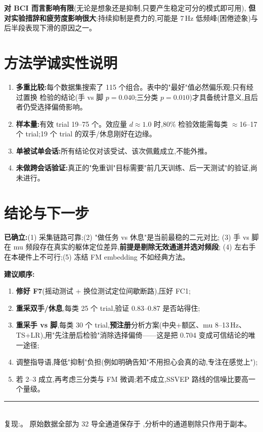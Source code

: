 \documentclass[11pt]{ctexart}
\begin{document}
\noindent\textbf{对 BCI 而言影响有限}(无论是想象还是抑制,只要产生稳定可分的模式即可用),
\textbf{但对实验措辞和疲劳度影响很大}:持续抑制是费力的,可能是 7\,Hz 低频峰(困倦迹象)与
后半段表现下滑的原因之一。

\section{方法学诚实性说明}
\begin{enumerate}
\item \textbf{多重比较:}每个数据集搜索了 115 个组合。表中的"最好"值必然偏乐观;只有经过置换
      检验的结论(手 vs 脚 $p=0.040$;三分类 $p=0.010$)才具备统计意义,且后者仍受选择偏倚影响。
\item \textbf{样本量:}有效 trial 19–75 个。效应量 $d\approx1.0$ 时,80\% 检验效能需每类 $\approx$16–17
      个 trial;19 个 trial 的双手/休息刚好在边缘。
\item \textbf{单被试单会话:}所有结论仅对该受试、该次佩戴成立,不能外推。
\item \textbf{未做跨会话验证:}真正的"免重训"目标需要"前几天训练、后一天测试"的验证,尚未进行。
\end{enumerate}

\section{结论与下一步}
\textbf{已确立:}(1) 采集链路可靠;(2) "做任务 vs 休息"是当前最稳的二元对比;
(3) 手 vs 脚在 mu 频段存在真实的躯体定位差异,\textbf{前提是剔除无效通道并选对频段};
(4) 左右手在本硬件上不可行;(5) 冻结 FM embedding 不如经典方法。

\textbf{建议顺序:}
\begin{enumerate}
\item \textbf{修好 F7}(摇动测试 + 换位测试定位间歇断路),压好 FC1;
\item \textbf{重采双手/休息},每类 25 个 trial,验证 0.83–0.87 是否站得住;
\item \textbf{重采手 vs 脚},每类 30 个 trial,\textbf{预注册}分析方案(中央+额区、mu 8–13\,Hz、
      TS+LR),用"先注册后检验"消除选择偏倚——这是把 0.704 变成可信结论的唯一途径;
\item 调整指导语,降低"抑制"负担(例如明确告知"不用担心会真的动,专注在感觉上");
\item 若 2–3 成立,再考虑三分类与 FM 微调;若不成立,SSVEP 路线的信噪比要高一个量级。
\end{enumerate}

\vspace{0.6em}\noindent\rule{\linewidth}{0.4pt}\\[2pt]
{\small 复现:。
原始数据全部为 32 导全通道保存于 ,分析中的通道剔除只作用于副本。}
\end{document}
